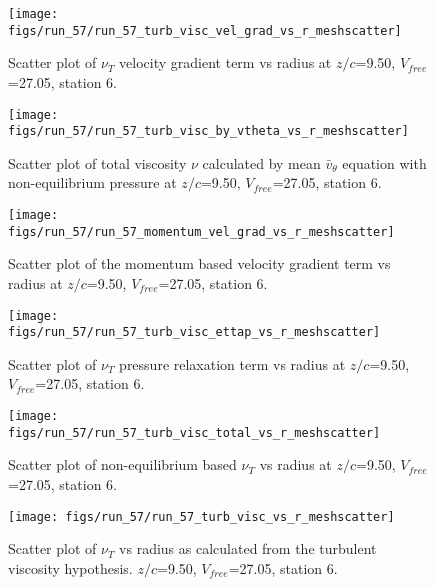 \begin{figure}[H]
\centering
\texttt{[image: figs/run\_57/run\_57\_turb\_visc\_vel\_grad\_vs\_r\_meshscatter]}
\caption{Scatter plot of $\nu_T$ velocity gradient term vs radius at $z/c$=9.50, $V_{free}$=27.05, station 6.}
\end{figure}


\begin{figure}[H]
\centering
\texttt{[image: figs/run\_57/run\_57\_turb\_visc\_by\_vtheta\_vs\_r\_meshscatter]}
\caption{Scatter plot of total viscosity $\nu$ calculated by mean $\bar{v}_{\theta}$ equation with non-equilibrium pressure at $z/c$=9.50, $V_{free}$=27.05, station 6.}
\end{figure}


\begin{figure}[H]
\centering
\texttt{[image: figs/run\_57/run\_57\_momentum\_vel\_grad\_vs\_r\_meshscatter]}
\caption{Scatter plot of the momentum based velocity gradient term vs radius at $z/c$=9.50, $V_{free}$=27.05, station 6.}
\end{figure}


\begin{figure}[H]
\centering
\texttt{[image: figs/run\_57/run\_57\_turb\_visc\_ettap\_vs\_r\_meshscatter]}
\caption{Scatter plot of $\nu_T$ pressure relaxation term vs radius at $z/c$=9.50, $V_{free}$=27.05, station 6.}
\end{figure}


\begin{figure}[H]
\centering
\texttt{[image: figs/run\_57/run\_57\_turb\_visc\_total\_vs\_r\_meshscatter]}
\caption{Scatter plot of non-equilibrium based $\nu_T$ vs radius at $z/c$=9.50, $V_{free}$=27.05, station 6.}
\end{figure}


\begin{figure}[H]
\centering
\texttt{[image: figs/run\_57/run\_57\_turb\_visc\_vs\_r\_meshscatter]}
\caption{Scatter plot of $\nu_T$ vs radius as calculated from the turbulent viscosity hypothesis. $z/c$=9.50, $V_{free}$=27.05, station 6.}
\end{figure}


